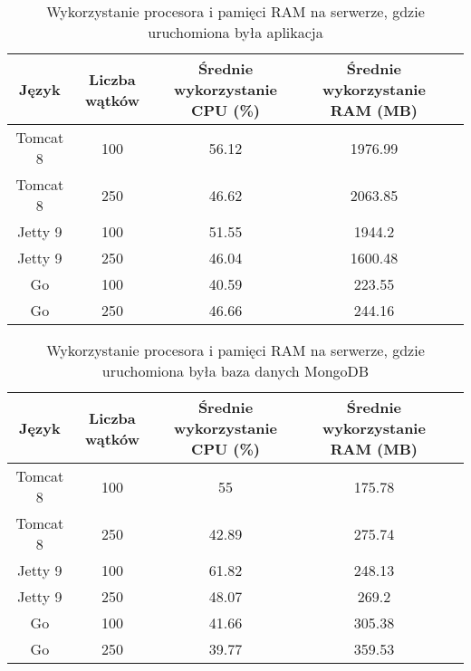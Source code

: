  \begin{table}[!htb]
 \centering
 \caption{Wykorzystanie procesora i pamięci RAM na serwerze, gdzie uruchomiona była aplikacja}
 \label{tab:app-clean-all}
 \begin{tabular}{@{}ccccl@{}}
 \toprule
 \textbf{Język} & \textbf{Liczba wątków} & \multicolumn{1}{p{3cm}}{\textbf{Średnie wykorzystanie CPU (\%)}} & \multicolumn{1}{p{3cm}}{\textbf{Średnie wykorzystanie RAM (MB)}} &  \\ \midrule
 Tomcat 8       & 100                    & 56.12                             & 1976.99                          &  \\
 Tomcat 8       & 250                    & 46.62                             & 2063.85                          &  \\
 Jetty 9       & 100                    & 51.55                             & 1944.2                          &  \\
 Jetty 9       & 250                    & 46.04                             & 1600.48                          &  \\
 Go       & 100                    & 40.59                             & 223.55                          &  \\
 Go       & 250                    & 46.66                             & 244.16                          &  \\
 \bottomrule
 \end{tabular}
 \end{table}


 \begin{table}[!htb]
 \centering
 \caption{Wykorzystanie procesora i pamięci RAM na serwerze, gdzie uruchomiona była baza danych MongoDB}
 \label{tab:mongo-clean-all}
 \begin{tabular}{@{}ccccl@{}}
 \toprule
 \textbf{Język} & \textbf{Liczba wątków} & \multicolumn{1}{p{3cm}}{\textbf{Średnie wykorzystanie CPU (\%)}} & \multicolumn{1}{p{3cm}}{\textbf{Średnie wykorzystanie RAM (MB)}} &  \\ \midrule
 Tomcat 8       & 100                    & 55                             & 175.78                          &  \\
 Tomcat 8       & 250                    & 42.89                             & 275.74                          &  \\
 Jetty 9       & 100                    & 61.82                             & 248.13                          &  \\
 Jetty 9       & 250                    & 48.07                             & 269.2                          &  \\
 Go       & 100                    & 41.66                             & 305.38                          &  \\
 Go       & 250                    & 39.77                             & 359.53                          &  \\
 \bottomrule
 \end{tabular}
 \end{table}


